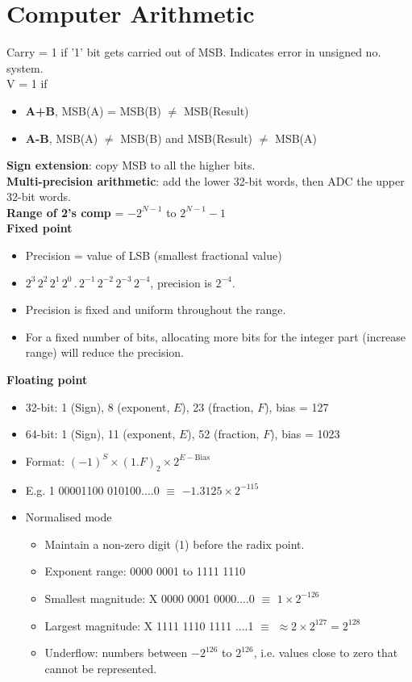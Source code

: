 \documentclass[10pt]{article}
\begin{document}
\section*{Computer Arithmetic}


Carry = 1 if '1' bit gets carried out of MSB. Indicates error in unsigned no. system.\\
V = 1 if 
\begin{itemize}
    \item \textbf{A+B}, MSB(A) = MSB(B) $\neq$ MSB(Result)
    \item \textbf{A-B}, MSB(A) $\neq$ MSB(B) and MSB(Result) $\neq$ MSB(A)
\end{itemize}
\textbf{Sign extension}: copy MSB to all the higher bits.\\
\textbf{Multi-precision arithmetic}: add the lower 32-bit words, then ADC the upper 32-bit words.\\
\textbf{Range of 2's comp} = $-2^{N-1}$ to $2^{N-1}-1$\\
\textbf{Fixed point}
\begin{itemize}
    \item Precision = value of LSB (smallest fractional value)
    \item $2^3\,2^2\,2^1\,2^0\,.\,2^{-1}\,2^{-2}\,2^{-3}\,2^{-4}$, precision is $2^{-4}$.
    \item Precision is fixed and uniform throughout the range.
    \item For a fixed number of bits, allocating more bits for the integer part (increase range) will reduce the precision.
\end{itemize}
\textbf{Floating point}
\begin{itemize}
    \item 32-bit: 1 (Sign), 8 (exponent, $E$), 23 (fraction, $F$), bias = 127
    \item 64-bit: 1 (Sign), 11 (exponent, $E$), 52 (fraction, $F$), bias = 1023
    \item Format: $(-1)^S \times (1.F)_2 \times 2^{E - \text{Bias}}$
    \item E.g. 1 00001100 010100....0 $\equiv$ $-1.3125\times 2^{-115}$
    \item Normalised mode
    \begin{itemize}
        \item Maintain a non-zero digit (1) before the radix point.
        \item Exponent range: 0000 0001 to 1111 1110
        \item Smallest magnitude: X 0000 0001 0000....0 $\equiv$ $1 \times 2^{-126}$
        \item Largest magnitude: X 1111 1110 1111 ....1 $\equiv$ $\approx 2 \times 2^{127} = 2^{128}$
        \item Underflow: numbers between $-2^{126}$ to $2^{126}$, i.e. values close to zero that cannot be represented.
    \end{itemize}
\end{itemize}
\end{document}

